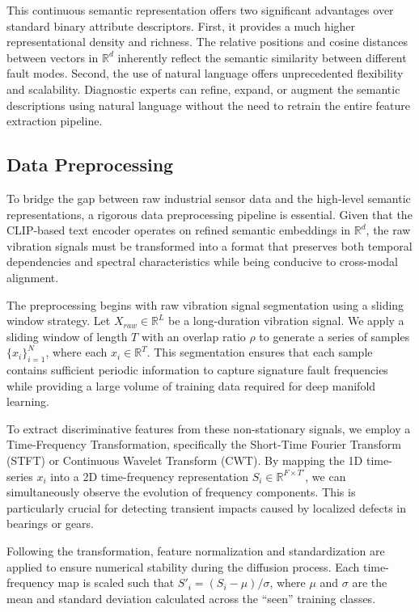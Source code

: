 \documentclass[journal,12pt,onecolumn]{IEEEtran}
\begin{document}
This continuous semantic representation offers two significant advantages over standard binary attribute descriptors. First, it provides a much higher representational density and richness. The relative positions and cosine distances between vectors in $\mathbb{R}^d$ inherently reflect the semantic similarity between different fault modes. Second, the use of natural language offers unprecedented flexibility and scalability. Diagnostic experts can refine, expand, or augment the semantic descriptions using natural language without the need to retrain the entire feature extraction pipeline.

\subsection{Data Preprocessing}
To bridge the gap between raw industrial sensor data and the high-level semantic representations, a rigorous data preprocessing pipeline is essential. Given that the CLIP-based text encoder operates on refined semantic embeddings in $\mathbb{R}^d$, the raw vibration signals must be transformed into a format that preserves both temporal dependencies and spectral characteristics while being conducive to cross-modal alignment.

The preprocessing begins with raw vibration signal segmentation using a sliding window strategy. Let $X_{raw} \in \mathbb{R}^L$ be a long-duration vibration signal. We apply a sliding window of length $T$ with an overlap ratio $\rho$ to generate a series of samples $\{x_i\}_{i=1}^N$, where each $x_i \in \mathbb{R}^T$. This segmentation ensures that each sample contains sufficient periodic information to capture signature fault frequencies while providing a large volume of training data required for deep manifold learning.

To extract discriminative features from these non-stationary signals, we employ a Time-Frequency Transformation, specifically the Short-Time Fourier Transform (STFT) or Continuous Wavelet Transform (CWT). By mapping the 1D time-series $x_i$ into a 2D time-frequency representation $S_i \in \mathbb{R}^{F \times T'}$, we can simultaneously observe the evolution of frequency components. This is particularly crucial for detecting transient impacts caused by localized defects in bearings or gears.

Following the transformation, feature normalization and standardization are applied to ensure numerical stability during the diffusion process. Each time-frequency map is scaled such that $S'_i = (S_i - \mu) / \sigma$, where $\mu$ and $\sigma$ are the mean and standard deviation calculated across the ``seen'' training classes.
\end{document}
